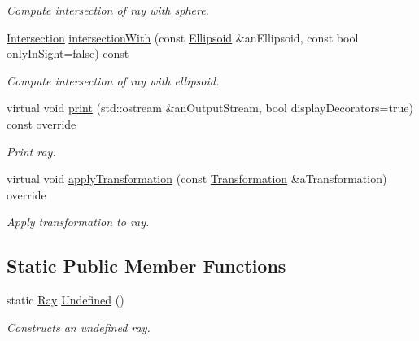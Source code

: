 \begin{DoxyCompactItemize}
\begin{DoxyCompactList}\small\item\em Compute intersection of ray with sphere. \end{DoxyCompactList}\item 
\hyperlink{classlibrary_1_1math_1_1geom_1_1d3_1_1_intersection}{Intersection} \hyperlink{classlibrary_1_1math_1_1geom_1_1d3_1_1objects_1_1_ray_aea1460113fed4868d652c5f3bd7a9422}{intersection\+With} (const \hyperlink{classlibrary_1_1math_1_1geom_1_1d3_1_1objects_1_1_ellipsoid}{Ellipsoid} \&an\+Ellipsoid, const bool only\+In\+Sight=false) const
\begin{DoxyCompactList}\small\item\em Compute intersection of ray with ellipsoid. \end{DoxyCompactList}\item 
virtual void \hyperlink{classlibrary_1_1math_1_1geom_1_1d3_1_1objects_1_1_ray_a2140183dca4c36f5c51ed9e8f2cd220d}{print} (std\+::ostream \&an\+Output\+Stream, bool display\+Decorators=true) const override
\begin{DoxyCompactList}\small\item\em Print ray. \end{DoxyCompactList}\item 
virtual void \hyperlink{classlibrary_1_1math_1_1geom_1_1d3_1_1objects_1_1_ray_a0dd177a924978e1817a9fa888594e694}{apply\+Transformation} (const \hyperlink{classlibrary_1_1math_1_1geom_1_1d3_1_1_transformation}{Transformation} \&a\+Transformation) override
\begin{DoxyCompactList}\small\item\em Apply transformation to ray. \end{DoxyCompactList}\end{DoxyCompactItemize}
\subsection*{Static Public Member Functions}
\begin{DoxyCompactItemize}
\item 
static \hyperlink{classlibrary_1_1math_1_1geom_1_1d3_1_1objects_1_1_ray}{Ray} \hyperlink{classlibrary_1_1math_1_1geom_1_1d3_1_1objects_1_1_ray_abf40bfaeab9e9024fd1fc73893da09e0}{Undefined} ()
\begin{DoxyCompactList}\small\item\em Constructs an undefined ray. \end{DoxyCompactList}\end{DoxyCompactItemize}


